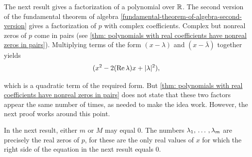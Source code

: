  The next result gives a factorization of a polynomial over $\mathbb{R}$. The second version of the fundamental theorem of algebra \ref{fundamental-theorem-of-algebra-second-version} gives a factorization of $p$ with complex coefficients. Complex but nonreal zeros of $p$ come in pairs (see \ref{thm: polynomials with real coefficients have nonreal zeros in pairs}). Multiplying terms of the form $(x-\lambda)$ and $(x-\overline{\lambda})$ together yields
\[
  (x^2 - 2( \operatorname{Re} \lambda) x + |\lambda|^2),
\]

which is a quadratic term of the required form. But \ref{thm: polynomials with real coefficients have nonreal zeros in pairs} does not state that these two factors appear the same number of times, as needed to make the idea work. However, the next proof works around this point.

In the next result, either $m$ or $M$ may equal $0$. The numbers $\lambda_1, {\, \ldots \,\,}, \lambda_m$ are precisely the real zeros of $p$, for these are the only real values of $x$ for which the right side of the equation in the next result equals $0$.

